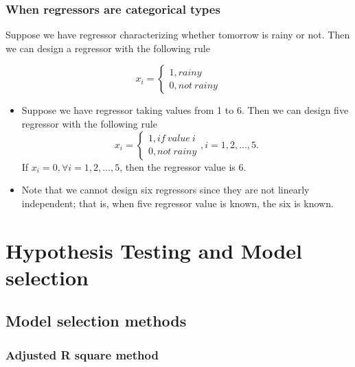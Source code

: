 \begin{refsection}
\subsubsection{When regressors are categorical types}

\begin{note}
	Suppose we have regressor characterizing whether tomorrow is rainy or not. Then we can design a regressor with the following rule
	
	$$x_i = \begin{cases*}
	1, rainy\\
	0, not~rainy
	\end{cases*}$$	
\end{note}


\begin{note}
\begin{itemize}
	\item 	Suppose we have regressor taking values from 1 to 6. Then we can design five regressor with the following rule
	$$x_i = \begin{cases*}
	1, if~value~i\\
	0, not~rainy
	\end{cases*}, i=1,2,...,5.$$
	If $x_i=0,\forall i=1,2,...,5$, then the regressor value is 6.
	\item Note that we cannot design six regressors since they are not linearly independent; that is, when five regressor value is known, the six is known.
\end{itemize}	
	
\end{note}





\section{Hypothesis Testing and Model selection}


\subsection{Model selection methods}
\subsubsection{Adjusted R square method}
\begin{definition}
	

\end{definition}
\end{refsection}
